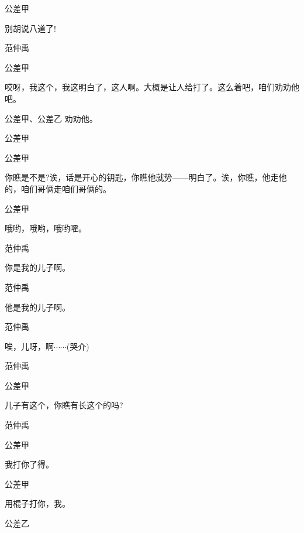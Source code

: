 公差甲\hspace{20pt}~

别胡说八道了!

范仲禹


公差甲

哎呀，我这个，我这明白了，这人啊。大概是让人给打了。这么着吧，咱们劝劝他吧。

公差甲、公差乙 劝劝他。

公差甲\hspace{20pt}~


公差甲

你瞧是不是?诶，话是开心的钥匙，你瞧他就势------明白了。诶，你瞧，他走他的，咱们哥俩走咱们哥俩的。

公差甲\hspace{20pt}~

哦哟，哦哟，哦哟嚯。

范仲禹\hspace{20pt}~

你是我的儿子啊。

范仲禹\hspace{20pt}~

他是我的儿子啊。

范仲禹\hspace{20pt}~

唉，儿呀，啊$\cdots{}\cdots{}$(哭介)

范仲禹\hspace{20pt}~


公差甲\hspace{20pt}~

儿子有这个，你瞧有长这个的吗?

范仲禹\hspace{20pt}~


公差甲\hspace{20pt}~

我打你了得。

公差甲\hspace{20pt}~

用棍子打你，我。

公差乙\hspace{20pt}~


